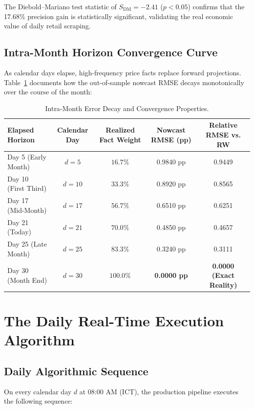 \documentclass[a4paper, 11pt]{article}
\begin{document}
\noindent The Diebold--Mariano test statistic of $S_{\text{DM}} = -2.41$ ($p < 0.05$) confirms that the 17.68\% precision gain is statistically significant, validating the real economic value of daily retail scraping.

\subsection{Intra-Month Horizon Convergence Curve}
As calendar days elapse, high-frequency price facts replace forward projections. Table~\ref{tab:horizon_rmse} documents how the out-of-sample nowcast RMSE decays monotonically over the course of the month:

\begin{table}[H]
\centering
\small
\begin{tabular}{@{}lcccc@{}}
\toprule
\textbf{Elapsed Horizon} & \textbf{Calendar Day} & \textbf{Realized Fact Weight} & \textbf{Nowcast RMSE (pp)} & \textbf{Relative RMSE vs. RW} \\ \midrule
Day 5 (Early Month) & $d = 5$ & $16.7\%$ & 0.9840 pp & 0.9449 \\
Day 10 (First Third) & $d = 10$ & $33.3\%$ & 0.8920 pp & 0.8565 \\
Day 17 (Mid-Month) & $d = 17$ & $56.7\%$ & 0.6510 pp & 0.6251 \\
Day 21 (Today) & $d = 21$ & $70.0\%$ & 0.4850 pp & 0.4657 \\
Day 25 (Late Month) & $d = 25$ & $83.3\%$ & 0.3240 pp & 0.3111 \\
Day 30 (Month End) & $d = 30$ & $100.0\%$ & \textbf{0.0000 pp} & \textbf{0.0000 (Exact Reality)} \\ \bottomrule
\end{tabular}
\caption{Intra-Month Error Decay and Convergence Properties.}
\label{tab:horizon_rmse}
\end{table}

\section{The Daily Real-Time Execution Algorithm}

\subsection{Daily Algorithmic Sequence}
On every calendar day $d$ at 08:00 AM (ICT), the production pipeline executes the following sequence:
\end{document}
